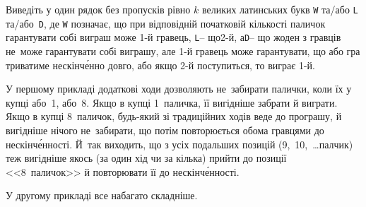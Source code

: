 \OutputFile
Виведіть у один рядок без пропусків рівно $k$ великих латинських букв \texttt{W} та/або \texttt{L} та/або~\texttt{D}, де \texttt{W} позначає, що при відповідній початковій кількості паличок гарантувати собі виграш може \mbox{1-й} гравець, \texttt{L}\nolinebreak[3] – що\nolinebreak[3] \mbox{2-й}, а\nolinebreak[2] \texttt{D}\nolinebreak[3] – що  жоден з гравців не~може гарантувати собі виграшу, але \mbox{1-й} гравець може гарантувати, що або гра триватиме нескін\-ч\'{е}\-нно довго, або якщо \mbox{2-й} поступиться, то виграє \mbox{1-й}.






\Examples

\begin{exampleSimple}{15.75em}{7em}
%
\end{exampleSimple}

\begin{examplewideSimple}
\hspace*{-3em}%
\end{examplewideSimple}


\Notes
У першому прикладі додаткові ходи дозволяють не~забирати палички, коли їх у купці або~1, або~8.
Якщо в купці 1~паличка, її вигідніше забрати й виграти.
Якщо в купці 8~паличок, будь-який зі традиційних ходів веде до програшу, й вигідніше нічого не~забирати, що потім повторюється обома гравцями до нескін\-ч\'{е}\-нно\-сті.
Й~так виходить, що з усіх подальших позицій (9,~10,~\dots\nolinebreak[3] палчик) теж вигідніше якось (за один хід чи за кілька) прийти до позиції <<8~паличок>> й повторювати її до нескін\-ч\'{е}\-нно\-сті.

У другому прикладі все набагато складніше.